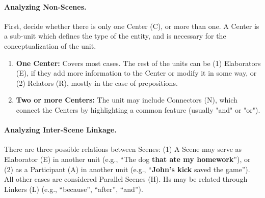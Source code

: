 \documentclass[11pt]{article}
\begin{document}
\paragraph{Analyzing Non-Scenes.}

First, decide whether there is only one Center (C), or more than one. A Center is a sub-unit which defines the type of the entity, and is necessary for the conceptualization of the unit.

\begin{enumerate}
\item
{\bf One Center:} Covers most cases. The rest of the units can be  (1) Elaborators (E), if they add more information to the Center or modify it in some way, or (2) Relators (R), mostly in the case of prepositions.
\item
{\bf Two or more Centers:} The unit may include Connectors (N), which connect the Centers by highlighting a common feature (usually "and" or "or").
\end{enumerate}

\paragraph{Analyzing Inter-Scene Linkage.}

There are three possible relations between Scenes:
(1) A Scene may serve as Elaborator (E) in another unit (e.g., ``The dog {\bf that ate my homework}''), 
or (2) as a Participant (A) in another unit (e.g., ``{\bf John's kick} saved the game'').
All other cases are considered Parallel Scenes (H). Hs may be related through Linkers (L) (e.g., ``because'', ``after'', ``and'').
\end{document}
